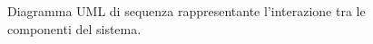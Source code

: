 \begin{figure}[h!]
    \hspace*{-3.4cm}
    \hspace*{1cm}
    \caption{Diagramma UML di sequenza rappresentante l'interazione tra le componenti del sistema.}
    \label{img:02-sequence-diagram}
\end{figure}
